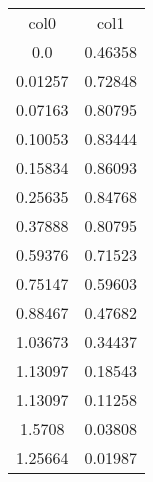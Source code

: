 \begin{table}
\begin{tabular}{cc}
col0 & col1 \\
0.0 & 0.46358 \\
0.01257 & 0.72848 \\
0.07163 & 0.80795 \\
0.10053 & 0.83444 \\
0.15834 & 0.86093 \\
0.25635 & 0.84768 \\
0.37888 & 0.80795 \\
0.59376 & 0.71523 \\
0.75147 & 0.59603 \\
0.88467 & 0.47682 \\
1.03673 & 0.34437 \\
1.13097 & 0.18543 \\
1.13097 & 0.11258 \\
1.5708 & 0.03808 \\
1.25664 & 0.01987 \\
\end{tabular}
\end{table}
